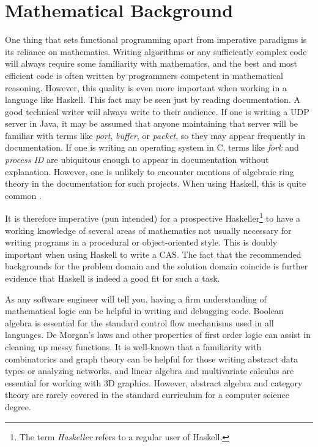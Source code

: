 \documentclass[MS, xcolor=dvipsnames]{wfuthesis}
\theoremstyle{definition}
\begin{document}
\chapter{Mathematical Background}
One thing that sets functional programming apart from imperative paradigms is its reliance on mathematics. Writing algorithms or any sufficiently complex code will always require some familiarity with mathematics, and the best and most efficient code is often written by programmers competent in mathematical reasoning. However, this quality is even more important when working in a language like Haskell. This fact may be seen just by reading documentation. A good technical writer will always write to their audience. If one is writing a UDP server in Java, it may be assumed that anyone maintaining that server will be familiar with terms like \textit{port}, \textit{buffer}, or \textit{packet}, so they may appear frequently in documentation. If one is writing an operating system in C, terms like \textit{fork} and \textit{process ID} are ubiquitous enough to appear in documentation without explanation. However, one is unlikely to encounter mentions of algebraic ring theory in the documentation for such projects. When using Haskell, this is quite common \cite{Prelude}. \par 
It is therefore imperative (pun intended) for a prospective Haskeller\footnote{The term \textit{Haskeller} refers to a regular user of Haskell.} to have a working knowledge of several areas of mathematics not usually necessary for writing programs in a procedural or object-oriented style. This is doubly important when using Haskell to write a CAS. The fact that the recommended backgrounds for the problem domain and the solution domain coincide is further evidence that Haskell is indeed a good fit for such a task. \par 
As any software engineer will tell you, having a firm understanding of mathematical logic can be helpful in writing and debugging code. Boolean algebra is essential for the standard control flow mechanisms used in all languages. De Morgan's laws and other properties of first order logic can assist in cleaning up messy functions. It is well-known that a familiarity with combinatorics and graph theory can be helpful for those writing abstract data types or analyzing networks, and linear algebra and multivariate calculus are essential for working with 3D graphics. However, abstract algebra and category theory are rarely covered in the standard curriculum for a computer science degree. \par 
\end{document}

